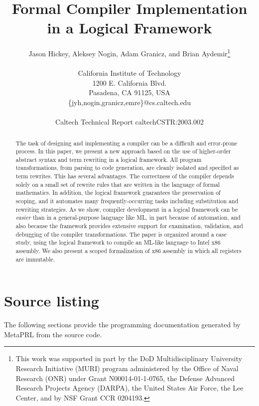 \documentclass[11pt]{article}
\begin{document}
\title{Formal Compiler Implementation in a Logical Framework}

\author{Jason Hickey, Aleksey Nogin, Adam Granicz, and Brian Aydemir\thanks{This
  work was supported in part by the DoD Multidisciplinary
  University Research Initiative (MURI) program administered by the
  Office of Naval Research (ONR) under Grant N00014-01-1-0765, the
  Defense Advanced Research Projects Agency (DARPA), the United States
  Air Force, the Lee Center, and by NSF Grant CCR 0204193.}\\
   \\
   California Institute of Technology\\
   1200 E. California Blvd.\\
   Pasadena, CA 91125, USA\\
   \{jyh,nogin,granicz,emre\}@cs.caltech.edu\\
   \\
   Caltech Technical Report caltechCSTR:2003.002}

\maketitle

\begin{abstract}
The task of designing and implementing a compiler can be a
difficult and error-prone process.  In this paper, we present a new
approach based on the use of higher-order abstract syntax and term
rewriting in a logical framework.  All program transformations, from
parsing to code generation, are cleanly isolated and specified as term
rewrites.  This has several advantages.  The correctness of the
compiler depends solely on a small set of rewrite rules that are
written in the language of formal mathematics.  In addition, the logical
framework guarantees the preservation of scoping, and it automates
many frequently-occurring tasks including substitution and rewriting
strategies.  As we show, compiler development in a logical framework
can be \emph{easier} than in a general-purpose language like ML, in
part because of automation, and also because the framework provides
extensive support for examination, validation, and debugging of the
compiler transformations.  The paper is organized around a case study,
using the \MetaPRL{} logical framework to compile an ML-like language to
Intel x86 assembly.  We also present a scoped formalization of x86
assembly in which all registers are immutable.

\end{abstract}

\sloppy


\newpage
\section{Source listing}

The following sections provide the programming documentation
generated by MetaPRL from the source code.






\printindex
\end{document}
